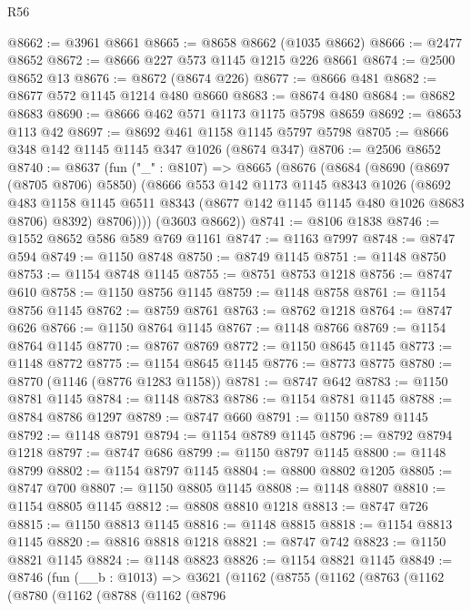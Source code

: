 \begin{lexlean}{R56}
\begin{coremodule}
@8662 := @3961 @8661
@8665 := @8658 @8662 (@1035 @8662)
@8666 := @2477 @8652
@8672 := @8666 @227 @573 @1145 @1215 @226 @8661
@8674 := @2500 @8652 @13
@8676 := @8672 (@8674 @226)
@8677 := @8666 @481
@8682 := @8677 @572 @1145 @1214 @480 @8660
@8683 := @8674 @480
@8684 := @8682 @8683
@8690 := @8666 @462 @571 @1173 @1175 @5798 @8659
@8692 := @8653 @113 @42
@8697 := @8692 @461 @1158 @1145 @5797 @5798
@8705 := @8666 @348 @142 @1145 @1145 @347 @1026 (@8674 @347)
@8706 := @2506 @8652
@8740 := @8637
    (fun ("_" : @8107) =>
    @8665
      (@8676
        (@8684
          (@8690
            (@8697 (@8705 @8706) @5850)
            (@8666
              @553
              @142
              @1173
              @1145
              @8343
              @1026
              (@8692
                @483
                @1158
                @1145
                @6511
                @8343
                (@8677 @142 @1145 @1145 @480 @1026 @8683 @8706)
                @8392)
              @8706))))
      (@3603 @8662))
@8741 := @8106 @1838
@8746 := @1552 @8652 @586 @589 @769 @1161
@8747 := @1163 @7997
@8748 := @8747 @594
@8749 := @1150 @8748
@8750 := @8749 @1145
@8751 := @1148 @8750
@8753 := @1154 @8748 @1145
@8755 := @8751 @8753 @1218
@8756 := @8747 @610
@8758 := @1150 @8756 @1145
@8759 := @1148 @8758
@8761 := @1154 @8756 @1145
@8762 := @8759 @8761
@8763 := @8762 @1218
@8764 := @8747 @626
@8766 := @1150 @8764 @1145
@8767 := @1148 @8766
@8769 := @1154 @8764 @1145
@8770 := @8767 @8769
@8772 := @1150 @8645 @1145
@8773 := @1148 @8772
@8775 := @1154 @8645 @1145
@8776 := @8773 @8775
@8780 := @8770 (@1146 (@8776 @1283 @1158))
@8781 := @8747 @642
@8783 := @1150 @8781 @1145
@8784 := @1148 @8783
@8786 := @1154 @8781 @1145
@8788 := @8784 @8786 @1297
@8789 := @8747 @660
@8791 := @1150 @8789 @1145
@8792 := @1148 @8791
@8794 := @1154 @8789 @1145
@8796 := @8792 @8794 @1218
@8797 := @8747 @686
@8799 := @1150 @8797 @1145
@8800 := @1148 @8799
@8802 := @1154 @8797 @1145
@8804 := @8800 @8802 @1205
@8805 := @8747 @700
@8807 := @1150 @8805 @1145
@8808 := @1148 @8807
@8810 := @1154 @8805 @1145
@8812 := @8808 @8810 @1218
@8813 := @8747 @726
@8815 := @1150 @8813 @1145
@8816 := @1148 @8815
@8818 := @1154 @8813 @1145
@8820 := @8816 @8818 @1218
@8821 := @8747 @742
@8823 := @1150 @8821 @1145
@8824 := @1148 @8823
@8826 := @1154 @8821 @1145
@8849 := @8746
    (fun (__b : @1013) =>
    @3621
      (@1162
        (@8755
          (@1162
            (@8763
              (@1162
                (@8780
                  (@1162
                    (@8788
                      (@1162
                        (@8796

\end{coremodule}
\end{lexlean}
